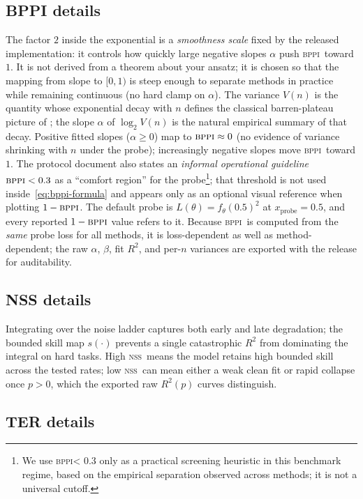 \documentclass{article}
\newcommand{\bppi}{\textsc{bppi}}
\newcommand{\nss}{\textsc{nss}}
\begin{document}
\subsection{BPPI details}

The factor $2$ inside the exponential is a \emph{smoothness scale} fixed by the released implementation: it controls how quickly large negative slopes $\alpha$ push \bppi\ toward $1$.
It is not derived from a theorem about your ansatz; it is chosen so that the mapping from slope to $[0,1)$ is steep enough to separate methods in practice while remaining continuous (no hard clamp on $\alpha$).
The variance $V(n)$ is the quantity whose exponential decay with $n$ defines the classical barren-plateau picture of \citet{mcclean2018barren}; the slope $\alpha$ of $\log_2 V(n)$ is the natural empirical summary of that decay.
Positive fitted slopes ($\alpha \ge 0$) map to $\bppi \approx 0$ (no evidence of variance shrinking with $n$ under the probe); increasingly negative slopes move \bppi\ toward $1$.
The protocol document also states an \emph{informal operational guideline} $\bppi < 0.3$ as a ``comfort region'' for the probe\footnote{We use \bppi < 0.3 only as a practical screening heuristic in this benchmark regime, based on the empirical separation observed across methods; it is not a universal cutoff.}; that threshold is not used inside~\eqref{eq:bppi-formula} and appears only as an optional visual reference when plotting $1-\bppi$.
The default probe is $L(\theta) = f_\theta(0.5)^2$ at $x_{\mathrm{probe}} = 0.5$, and every reported $1-\bppi$ value refers to it.
Because \bppi\ is computed from the \emph{same} probe loss for all methods, it is loss-dependent as well as method-dependent; the raw $\alpha$, $\beta$, fit $R^2$, and per-$n$ variances are exported with the release for auditability.

\subsection{NSS details}

Integrating over the noise ladder captures both early and late degradation; the bounded skill map $s(\cdot)$ prevents a single catastrophic $R^2$ from dominating the integral on hard tasks.
High \nss\ means the model retains high bounded skill across the tested rates; low \nss\ can mean either a weak clean fit or rapid collapse once $p>0$, which the exported raw $R^2(p)$ curves distinguish.

\subsection{TER details}
\end{document}
